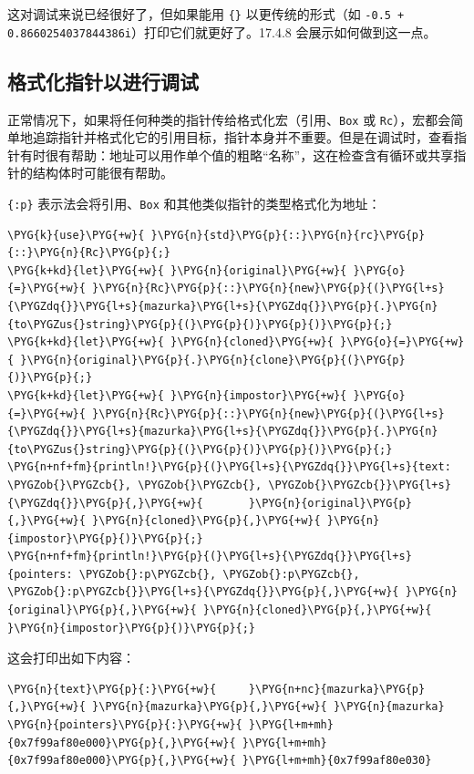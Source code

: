 这对调试来说已经很好了，但如果能用 \texttt{\{\}} 以更传统的形式（如 \texttt{-0.5 + 0.8660254037844386i}）打印它们就更好了。17.4.8 会展示如何做到这一点。

\subsection{格式化指针以进行调试}

正常情况下，如果将任何种类的指针传给格式化宏（引用、\texttt{Box} 或 \texttt{Rc}），宏都会简单地追踪指针并格式化它的引用目标，指针本身并不重要。但是在调试时，查看指针有时很有帮助：地址可以用作单个值的粗略“名称”，这在检查含有循环或共享指针的结构体时可能很有帮助。

\texttt{\{:p\}} 表示法会将引用、\texttt{Box} 和其他类似指针的类型格式化为地址：

\begin{Verbatim}[commandchars=\\\{\},breaklines=true,breakanywhere=true,fontsize=\codefont,xleftmargin=17bp]
\PYG{k}{use}\PYG{+w}{ }\PYG{n}{std}\PYG{p}{::}\PYG{n}{rc}\PYG{p}{::}\PYG{n}{Rc}\PYG{p}{;}
\PYG{k+kd}{let}\PYG{+w}{ }\PYG{n}{original}\PYG{+w}{ }\PYG{o}{=}\PYG{+w}{ }\PYG{n}{Rc}\PYG{p}{::}\PYG{n}{new}\PYG{p}{(}\PYG{l+s}{\PYGZdq{}}\PYG{l+s}{mazurka}\PYG{l+s}{\PYGZdq{}}\PYG{p}{.}\PYG{n}{to\PYGZus{}string}\PYG{p}{(}\PYG{p}{)}\PYG{p}{)}\PYG{p}{;}
\PYG{k+kd}{let}\PYG{+w}{ }\PYG{n}{cloned}\PYG{+w}{ }\PYG{o}{=}\PYG{+w}{ }\PYG{n}{original}\PYG{p}{.}\PYG{n}{clone}\PYG{p}{(}\PYG{p}{)}\PYG{p}{;}
\PYG{k+kd}{let}\PYG{+w}{ }\PYG{n}{impostor}\PYG{+w}{ }\PYG{o}{=}\PYG{+w}{ }\PYG{n}{Rc}\PYG{p}{::}\PYG{n}{new}\PYG{p}{(}\PYG{l+s}{\PYGZdq{}}\PYG{l+s}{mazurka}\PYG{l+s}{\PYGZdq{}}\PYG{p}{.}\PYG{n}{to\PYGZus{}string}\PYG{p}{(}\PYG{p}{)}\PYG{p}{)}\PYG{p}{;}
\PYG{n+nf+fm}{println!}\PYG{p}{(}\PYG{l+s}{\PYGZdq{}}\PYG{l+s}{text:     \PYGZob{}\PYGZcb{}, \PYGZob{}\PYGZcb{}, \PYGZob{}\PYGZcb{}}\PYG{l+s}{\PYGZdq{}}\PYG{p}{,}\PYG{+w}{       }\PYG{n}{original}\PYG{p}{,}\PYG{+w}{ }\PYG{n}{cloned}\PYG{p}{,}\PYG{+w}{ }\PYG{n}{impostor}\PYG{p}{)}\PYG{p}{;}
\PYG{n+nf+fm}{println!}\PYG{p}{(}\PYG{l+s}{\PYGZdq{}}\PYG{l+s}{pointers: \PYGZob{}:p\PYGZcb{}, \PYGZob{}:p\PYGZcb{}, \PYGZob{}:p\PYGZcb{}}\PYG{l+s}{\PYGZdq{}}\PYG{p}{,}\PYG{+w}{ }\PYG{n}{original}\PYG{p}{,}\PYG{+w}{ }\PYG{n}{cloned}\PYG{p}{,}\PYG{+w}{ }\PYG{n}{impostor}\PYG{p}{)}\PYG{p}{;}
\end{Verbatim}

这会打印出如下内容：

\begin{Verbatim}[commandchars=\\\{\},breaklines=true,breakanywhere=true,fontsize=\codefont,xleftmargin=17bp]
\PYG{n}{text}\PYG{p}{:}\PYG{+w}{     }\PYG{n+nc}{mazurka}\PYG{p}{,}\PYG{+w}{ }\PYG{n}{mazurka}\PYG{p}{,}\PYG{+w}{ }\PYG{n}{mazurka}
\PYG{n}{pointers}\PYG{p}{:}\PYG{+w}{ }\PYG{l+m+mh}{0x7f99af80e000}\PYG{p}{,}\PYG{+w}{ }\PYG{l+m+mh}{0x7f99af80e000}\PYG{p}{,}\PYG{+w}{ }\PYG{l+m+mh}{0x7f99af80e030}
\end{Verbatim}

